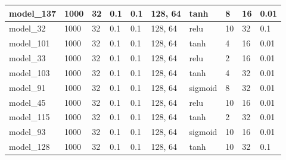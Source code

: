 \begin{tabular}{|l|l|l|l|l|l|l|l|l|l|}
model\_137     & 1000           & 32           & 0.1          & 0.1          & 128, 64     & tanh         & 8                    & 16                    & 0.01                       \\ \hline
model\_32      & 1000           & 32           & 0.1          & 0.1          & 128, 64     & relu         & 10                   & 32                    & 0.1                        \\ \hline
model\_101     & 1000           & 32           & 0.1          & 0.1          & 128, 64     & tanh         & 4                    & 16                    & 0.01                       \\ \hline
model\_33      & 1000           & 32           & 0.1          & 0.1          & 128, 64     & relu         & 2                    & 16                    & 0.01                       \\ \hline
model\_103     & 1000           & 32           & 0.1          & 0.1          & 128, 64     & tanh         & 4                    & 32                    & 0.01                       \\ \hline
model\_91      & 1000           & 32           & 0.1          & 0.1          & 128, 64     & sigmoid      & 8                    & 32                    & 0.01                       \\ \hline
model\_45      & 1000           & 32           & 0.1          & 0.1          & 128, 64     & relu         & 10                   & 16                    & 0.01                       \\ \hline
model\_115     & 1000           & 32           & 0.1          & 0.1          & 128, 64     & tanh         & 2                    & 32                    & 0.01                       \\ \hline
model\_93      & 1000           & 32           & 0.1          & 0.1          & 128, 64     & sigmoid      & 10                   & 16                    & 0.01                       \\ \hline
model\_128     & 1000           & 32           & 0.1          & 0.1          & 128, 64     & tanh         & 10                   & 32                    & 0.1                        \\ \hline
\end{tabular}